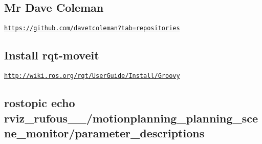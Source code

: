 \subsection*{Mr Dave Coleman }

\href{https://github.com/davetcoleman?tab=repositories}{\tt https\-://github.\-com/davetcoleman?tab=repositories}

\subsection*{Install rqt-\/moveit }

\href{http://wiki.ros.org/rqt/UserGuide/Install/Groovy}{\tt http\-://wiki.\-ros.\-org/rqt/\-User\-Guide/\-Install/\-Groovy}

\subsection*{rostopic echo rviz\-\_\-rufous\-\_\-\_/motionplanning\-\_\-planning\-\_\-scene\-\_\-monitor/parameter\-\_\-descriptions }

